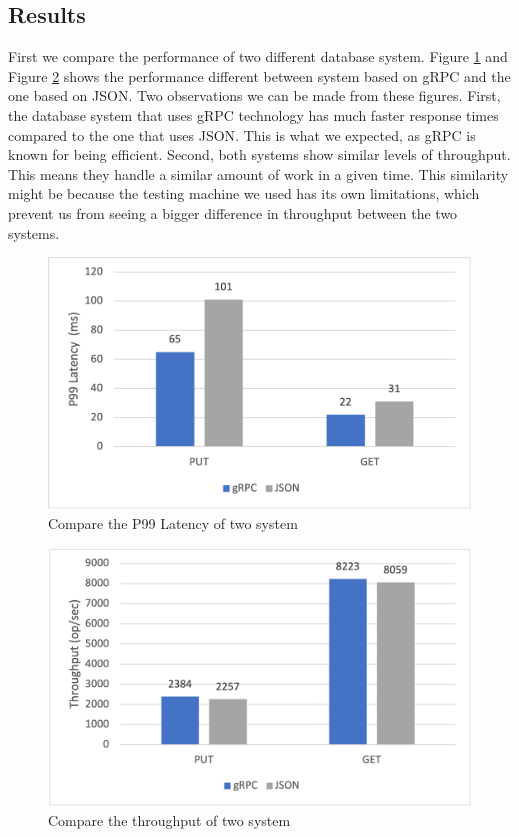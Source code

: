 \documentclass[sigconf]{acmart}
\begin{document}
\subsection{Results}
First we compare the performance of two different database system.  Figure \ref{fig:latnecy} and Figure \ref{fig:throughput} shows the performance different between system based on gRPC and the one based on JSON. Two observations we can be made from these figures. First, the database system that uses gRPC technology has much faster response times compared to the one that uses JSON. This is what we expected, as gRPC is known for being efficient. Second, both systems show similar levels of throughput. This means they handle a similar amount of work in a given time. This similarity might be because the testing machine we used has its own limitations, which prevent us from seeing a bigger difference in throughput between the two systems.
\begin{figure}
    \centering
    \includegraphics[width=1\linewidth]{latency.png}
    \caption{Compare the P99 Latency of two system}
    \label{fig:latnecy}
\end{figure}
\begin{figure}
    \centering
    \includegraphics[width=1\linewidth]{throughput.png}
    \caption{Compare the throughput of two system}
    \label{fig:throughput}
\end{figure}
\end{document}
